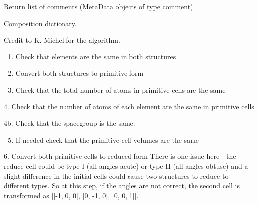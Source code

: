 \documentclass[letterpaper,10pt,english]{sphinxmanual}
\begin{document}
\begin{fulllineitems}
\begin{fulllineitems}
\label{models:qmpy.Structure.comment_objects}
Return list of comments (MetaData objects of type comment)

\end{fulllineitems}


\begin{fulllineitems}
\label{models:qmpy.Structure.comp}
Composition dictionary.

\end{fulllineitems}


\begin{fulllineitems}
\label{models:qmpy.Structure.compare}
Credit to K. Michel for the algorithm.
\begin{enumerate}
\item {} 
Check that elements are the same in both structures

\item {} 
Convert both structures to primitive form

\item {} 
Check that the total number of atoms in primitive cells are the same

\end{enumerate}

4. Check that the number of atoms of each element are the same in
primitive cells

4b. Check that the spacegroup is the same.
\begin{enumerate}
\setcounter{enumi}{4}
\item {} 
If needed check that the primitive cell volumes are the same

\end{enumerate}

6. Convert both primitive cells to reduced form There is one issue here - 
the reduce cell could be type I (all angles acute) or type II (all angles 
obtuse) and a slight difference in the initial cells could cause two 
structures to reduce to different types. So at this step, if the angles 
are not correct, the second cell is transformed as 
{[}{[}-1, 0, 0{]}, {[}0, -1, 0{]}, {[}0, 0, 1{]}{]}.


\end{fulllineitems}
\end{fulllineitems}
\end{document}
